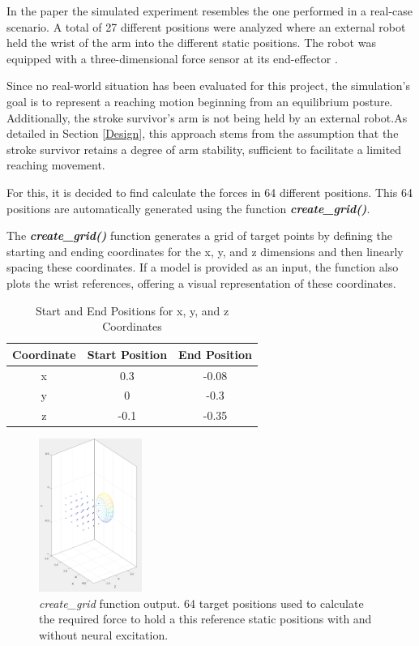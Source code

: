  In the paper \cite{QSC} the simulated experiment resembles the one performed in a real-case scenario. A total of 27 different positions were analyzed where an external robot held the wrist of the arm into the different static positions. The robot was equipped with a three-dimensional force sensor at its end-effector \cite{HSAC}. 
 
 Since no real-world situation has been evaluated for this project, the simulation's goal is to represent a reaching motion beginning from an equilibrium posture. Additionally, the stroke survivor's arm is not being held by an external robot.As detailed in Section \ref{Design}, this approach stems from the assumption that the stroke survivor retains a degree of arm stability, sufficient to facilitate a limited reaching movement.  

 For this, it is decided to find calculate the forces in 64 different positions. This 64 positions are automatically generated using the function \textit{\textbf{create\_grid()}}.


The \textbf{\textit{create\_grid()}} function generates a grid of target points by defining the starting and ending coordinates for the x, y, and z dimensions and then linearly spacing these coordinates. If a model is provided as an input, the function also plots the wrist references, offering a visual representation of these coordinates.

\begin{table}[h]
    \centering
    \caption{Start and End Positions for x, y, and z Coordinates}

    \begin{tabular}{|c|c|c|}
        \hline
        Coordinate & Start Position & End Position \\
        \hline
        x & 0.3 & -0.08 \\
        y & 0 & -0.3 \\
        z & -0.1 & -0.35 \\
        \hline
    \end{tabular}
    \label{table:coordinates}
\end{table}

\begin{figure}[h!]
    \centering
    \includegraphics[width=0.3\textwidth]{Pictures/Model/create_grid.png}
    \caption{\textit{create\_grid} function output. 64 target positions used to calculate the required force to hold a this reference static positions with and without neural excitation.}
    \label{fig:create_grid}
\end{figure}

